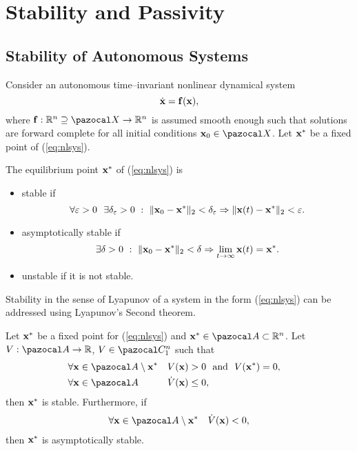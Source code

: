 \section{Stability and Passivity}

\subsection{Stability of Autonomous Systems}
%
Consider an autonomous time--invariant nonlinear dynamical system
%
\begin{equation}\label{eq:nlsys}
    \dot{\mathbf{x}} = \mathbf{f}(\mathbf{x}),
\end{equation}
%
where $\mathbf{f}:\R^n\supseteq\X\rightarrow\R^n$ is assumed smooth enough such that solutions are forward complete for all initial conditions $\xb_0\in\X$. Let $\mathbf{x}^*$ be a fixed point of (\ref{eq:nlsys}).
%
\begin{defn}
    The equilibrium point $\mathbf{x}^*$ of (\ref{eq:nlsys}) is 
    \begin{itemize}
        \item stable if
            \begin{equation}
                \forall \varepsilon>0 ~~  \exists \delta_\varepsilon>0~:~\|\mathbf{x}_0 - \mathbf{x}^*\|_2 <\delta_\varepsilon \Rightarrow \|\mathbf{x}(t) - \mathbf{x}^*\|_2<\varepsilon.
            \end{equation}
            \item asymptotically stable if
            \begin{equation}
                \exists \delta>0~:~\|\mathbf{x}_0 - \mathbf{x}^*\|_2<\delta\Rightarrow\lim_{t\rightarrow\infty}\mathbf{x}(t) =  \mathbf{x}^*.
            \end{equation}
        \item unstable if it is not stable.
    \end{itemize}
\end{defn}
%
Stability in the sense of Lyapunov of a system in the form (\ref{eq:nlsys}) can be addressed using Lyapunov's Second theorem.
%
\begin{thm}\label{thm:lyap_nl}
    Let $\mathbf{x}^*$ be a fixed point for (\ref{eq:nlsys}) and $\xb^*\in\A\subset\R^n$. Let $V:\A\rightarrow\R$, $V\in\C_1^n$ such that
    \begin{align}
        & \forall \xb\in\A\setminus\xb^* && V(\xb)>0~~\text{and}~~V(\xb^*) = 0,&\\
        & \forall \xb\in\A & &\dot{V}(\xb)\leq 0,&
    \end{align}
    then $\mathbf{x}^*$ is stable. Furthermore, if
    \begin{align}
        \forall \xb\in\A \setminus\xb^* ~~~ \dot{V}(\xb)< 0,
    \end{align}
    then $\mathbf{x}^*$ is asymptotically stable.
\end{thm}
%
\clearpage

